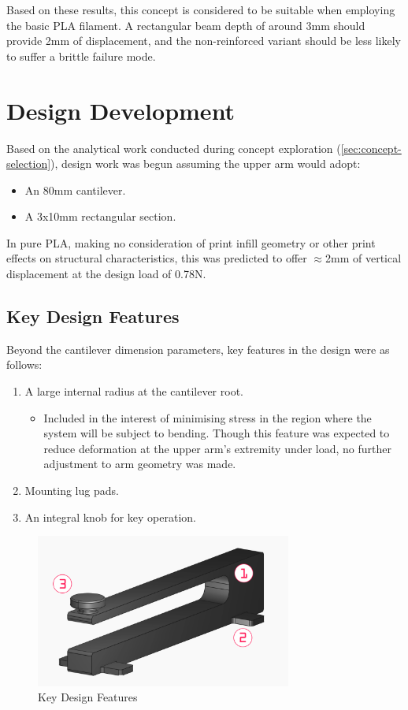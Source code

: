 \documentclass[10pt]{article}
\begin{document}
Based on these results, this concept is considered to be suitable when employing the basic PLA
filament. A rectangular beam depth of around 3mm should provide 2mm of displacement, and the
non-reinforced variant should be less likely to suffer a brittle failure mode.

\section{Design Development}
Based on the analytical work conducted during concept exploration
(\autoref{sec:concept-selection}), design work was begun assuming the upper arm would adopt:
\begin{itemize}[leftmargin=*]
	\item An 80mm cantilever.
	\item A 3x10mm rectangular section.
\end{itemize}

In pure PLA, making no consideration of print infill geometry or other print effects on structural
characteristics, this was predicted to offer $\approx$2mm of vertical displacement at the design
load of 0.78N.

\subsection{Key Design Features}
Beyond the cantilever dimension parameters, key features in the design were as follows:
\begin{enumerate}
	\item A large internal radius at the cantilever root.
	      \begin{itemize} \item Included in the interest of minimising stress in the region where the system will be subject to
		            bending. Though this feature was expected to reduce deformation at the upper arm's extremity under
		            load, no further adjustment to arm geometry was made. \end{itemize}
	\item Mounting lug pads.
	\item An integral knob for key operation.
\end{enumerate}

\begin{figure}[H]
	\centering
	\includegraphics[width=0.75\textwidth]{./assets/10-key-design-features.png}
	\caption{Key Design Features}
	\label{fig:key-design-features}
\end{figure}
\end{document}
